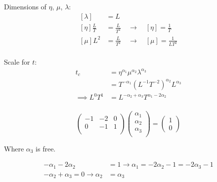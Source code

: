 \documentclass[12pt,twoside]{article}
\begin{document}
Dimensions of $\eta$, $\mu$, $\lambda$:
\begin{equation}
  \begin{aligned}
    [\lambda] &= L \\
    [\eta]\frac{L}{T} &= \frac{L}{T^2} \quad\longrightarrow\quad [\eta] = \frac{1}{T} \\
    [\mu]L^2 &= \frac{L}{T^2} \quad\longrightarrow\quad [\mu] = \frac{1}{LT^2} \\
  \end{aligned}
\end{equation}

Scale for $t$:
\begin{equation}
  \begin{aligned}
    t_c &= \eta^{\alpha_1}\mu^{\alpha_2}\lambda^{\alpha_3} \\
    &= T^{-\alpha_1}{(L^{-1}T^{-2})}^{\alpha_2}L^{\alpha_3} \\
    \implies L^0T^1 &= L^{-\alpha_2+\alpha_3}T^{\alpha_1-2\alpha_2} \\
  \end{aligned}
\end{equation}

\begin{equation}
  \begin{pmatrix}
    -1 & -2 & 0 \\
    0 & -1 & 1 \\
  \end{pmatrix}
\begin{pmatrix}
  \alpha_1 \\
  \alpha_2 \\
  \alpha_3 \\
\end{pmatrix}
=
\begin{pmatrix}
  1\\0
\end{pmatrix}
\end{equation}

Where $\alpha_3$ is free.

\begin{equation}
  \begin{aligned}
    -\alpha_1-2\alpha_2 &= 1 \rightarrow \alpha_1=-2\alpha_2-1=-2\alpha_3-1\\
    -\alpha_2 + \alpha_3 = 0 \rightarrow \alpha_2&=\alpha_3
  \end{aligned}
\end{equation}
\end{document}
